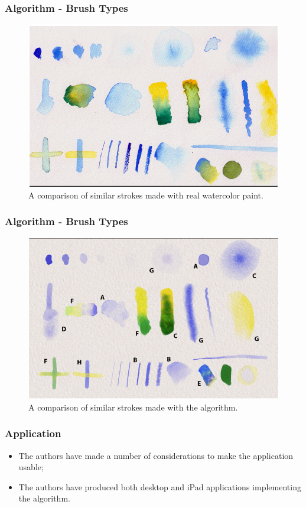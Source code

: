 \documentclass{beamer}
\begin{document}
\begin{frame}
    \frametitle{Algorithm - Brush Types}
    \begin{figure}
        \centering
        \includegraphics[width=0.8\paperwidth]{f4-1.png}
        \caption{\footnotesize{A comparison of similar strokes made with real
        watercolor paint.}}
    \end{figure}
\end{frame}

\begin{frame}
    \frametitle{Algorithm - Brush Types}
    \begin{figure}
        \centering
        \includegraphics[width=0.8\paperwidth]{f4-2.png}
        \caption{\footnotesize{A comparison of similar strokes made with the
        algorithm.}}
    \end{figure}
\end{frame}

\begin{frame}
    \frametitle{Application}
    \begin{itemize}
        \item The authors have made a number of considerations to make the
        application usable;
        \item The authors have produced both desktop and iPad applications
        implementing the algorithm.
    \end{itemize}
\end{frame}
\end{document}
